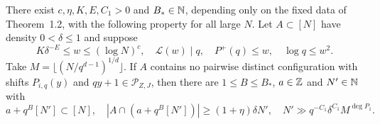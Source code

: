 \begin{proposition}\label{p:selected-density-increment}
\leanok
{}
There exist $c,\eta,K,E,C_1>0$ and $B_*\in\mathbb N$, depending only on the
fixed data of Theorem~1.2, with the following property for all large $N$.
Let $A\subset[N]$ have density $0<\delta\le1$ and suppose
\[
 K\delta^{-E}\le w\le(\log N)^c,\quad
 \mathcal L(w)\mid q,\quad P^+(q)\le w,\quad \log q\le w^2.
\]
Take $M=\lfloor(N/q^{d-1})^{1/d}\rfloor$.
If $A$ contains no pairwise distinct configuration with shifts
$P_{i,q}(y)$ and $qy+1\in\mathcal P_{Z,J}$, then there are
$1\le B\le B_*$, $a\in\mathbb Z$ and $N'\in\mathbb N$ with
\[
 a+q^B[N']\subset[N],\quad
 |A\cap(a+q^B[N'])|\ge(1+\eta)\delta N',\quad
 N'\gg q^{-C_1}\delta^{C_1}M^{\deg P_1}.
\]
\end{proposition}
